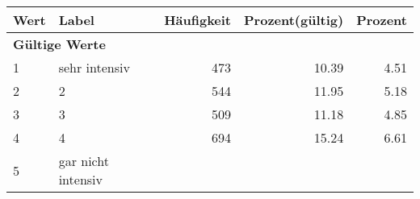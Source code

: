      \begin{longtable}{lXrrr}
     \toprule
     \textbf{Wert} & \textbf{Label} & \textbf{Häufigkeit} & \textbf{Prozent(gültig)} & \textbf{Prozent} \\
     \endhead
     \midrule
     \multicolumn{5}{l}{\textbf{Gültige Werte}}\\

     1 &
     \multicolumn{1}{X}{ sehr intensiv   } &


       \num{473} &
       \num[round-mode=places,round-precision=2]{10.39} &
         \num[round-mode=places,round-precision=2]{4.51} \\

     2 &
     \multicolumn{1}{X}{ 2   } &


       \num{544} &
       \num[round-mode=places,round-precision=2]{11.95} &
         \num[round-mode=places,round-precision=2]{5.18} \\

     3 &
     \multicolumn{1}{X}{ 3   } &


       \num{509} &
       \num[round-mode=places,round-precision=2]{11.18} &
         \num[round-mode=places,round-precision=2]{4.85} \\

     4 &
     \multicolumn{1}{X}{ 4   } &


       \num{694} &
       \num[round-mode=places,round-precision=2]{15.24} &
         \num[round-mode=places,round-precision=2]{6.61} \\

     5 &
     \multicolumn{1}{X}{ gar nicht intensiv   } &



\end{longtable}
